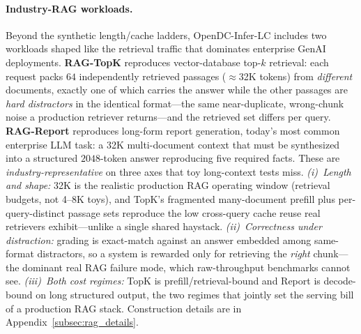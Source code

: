\paragraph{Industry-RAG workloads.}
Beyond the synthetic length/cache ladders, OpenDC-Infer-LC includes two workloads
shaped like the retrieval traffic that dominates enterprise GenAI deployments.
\textbf{RAG-TopK} reproduces vector-database top-$k$ retrieval: each request packs
$64$ independently retrieved passages ($\approx$32K tokens) from \emph{different}
documents, exactly one of which carries the answer while the other passages are
\emph{hard distractors} in the identical format---the same near-duplicate, wrong-chunk
noise a production retriever returns---and the retrieved set differs per query.
\textbf{RAG-Report} reproduces long-form report generation, today's most common
enterprise LLM task: a 32K multi-document context that must be synthesized into a
structured $2048$-token answer reproducing five required facts. These are
\emph{industry-representative} on three axes that toy long-context tests miss.
\emph{(i)~Length and shape:} 32K is the realistic production RAG operating window
(retrieval budgets, not 4--8K toys), and TopK's fragmented many-document prefill
plus per-query-distinct passage sets reproduce the low cross-query cache reuse real
retrievers exhibit---unlike a single shared haystack. \emph{(ii)~Correctness under
distraction:} grading is exact-match against an answer embedded among same-format
distractors, so a system is rewarded only for retrieving the \emph{right} chunk---the
dominant real RAG failure mode, which raw-throughput benchmarks cannot see.
\emph{(iii)~Both cost regimes:} TopK is prefill/retrieval-bound and Report is
decode-bound on long structured output, the two regimes that jointly set the serving
bill of a production RAG stack. Construction details are in
Appendix~\ref{subsec:rag_details}.

